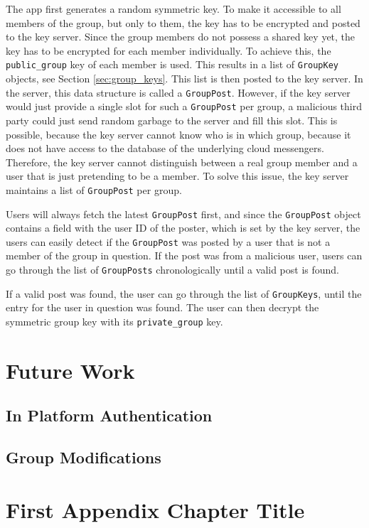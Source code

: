 \documentclass[a4paper, oneside]{discothesis}
\begin{document}
The app first generates a random symmetric key. To make it accessible to all members of the group, but only to them, the key has to be encrypted and posted to the key server. Since the group members do not possess a shared key yet, the key has to be encrypted for each member individually. To achieve this, the \texttt{public\_group} key of each member is used. This results in a list of \texttt{GroupKey} objects, see Section \ref{sec:group_keys}. This list is then posted to the key server. In the server, this data structure is called a \texttt{GroupPost}. However, if the key server would just provide a single slot for such a \texttt{GroupPost} per group, a malicious third party could just send random garbage to the server and fill this slot. This is possible, because the key server cannot know who is in which group, because it does not have access to the database of the underlying cloud messengers. Therefore, the key server cannot distinguish between a real group member and a user that is just pretending to be a member. To solve this issue, the key server maintains a list of \texttt{GroupPost} per group.

Users will always fetch the latest \texttt{GroupPost} first, and since the \texttt{GroupPost} object contains a field with the user ID of the poster, which is set by the key server, the users can easily detect if the \texttt{GroupPost} was posted by a user that is not a member of the group in question. If the post was from a malicious user, users can go through the list of \texttt{GroupPosts} chronologically until a valid post is found.

If a valid post was found, the user can go through the list of \texttt{GroupKeys}, until the entry for the user in question was found. The user can then decrypt the symmetric group key with its \texttt{private\_group} key.

\chapter{Future Work}
\label{sec:future_work}

\section{In Platform Authentication}

\section{Group Modifications}




\appendix
\chapter{First Appendix Chapter Title}
\end{document}
